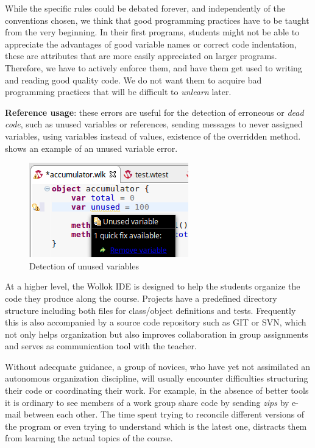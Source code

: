 While the specific rules could be debated forever, and independently of the conventions chosen,
we think that good programming practices have to be taught from the very beginning.
In their first programs, students might not be able to appreciate the advantages of good variable names or correct code indentation, these are attributes that are more easily appreciated on larger programs.
Therefore, we have to actively enforce them, and have them get used to writing and reading good quality code.
We do not want them to acquire bad programming practices that will be difficult to \emph{unlearn} later.

\textbf{Reference usage}: 
		these errors are useful for the detection of erroneous or \textit{dead code}, such as unused variables or references, 
		sending messages to never assigned variables, using variables instead of values, existence of the overridden method.
		 shows an example of an unused variable error.


\begin{figure}[ht]
    \centering
	\includegraphics[scale=0.5]{images/wollok-paper-check-unusedVariable.png}
    \caption{Detection of unused variables}
    \label{fig:check-unusedVariable.png}
\end{figure}

\medskip
At a higher level, the Wollok IDE is designed to help the students organize the code they produce along the course. 
Projects have a predefined directory structure including both files for class/object definitions and tests.
Frequently this is also accompanied by a source code repository such as GIT or SVN,
which not only helps organization but also improves collaboration in group assignments
and serves as communication tool with the teacher.

Without adecquate guidance, a group of novices, who have yet not assimilated an autonomous organization discipline, will usually encounter difficulties structuring their code or coordinating their work.
For example, in the absence of better tools it is ordinary to see members of a work group share code by sending \emph{zips} by e-mail between each other.
The time spent trying to reconcile different versions of the program or even trying to understand which is the latest one, distracts them from learning the actual topics of the course.

